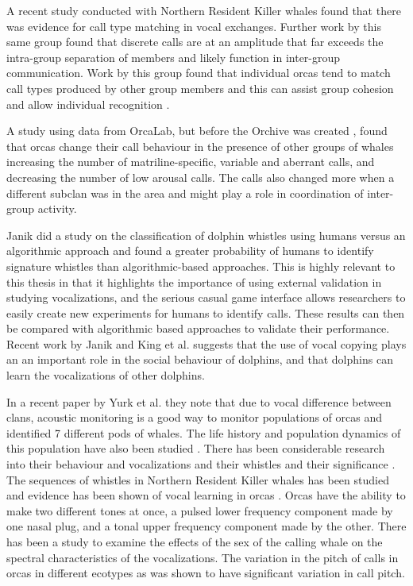 A recent study \cite{miller2004matching} conducted with Northern
Resident Killer whales found that there was evidence for call type
matching in vocal exchanges.  Further work by this same group
\cite{miller2006diversity} found that discrete calls are at an
amplitude that far exceeds the intra-group separation of members and
likely function in inter-group communication.  Work by this group
found that individual orcas tend to match call types produced by other
group members \cite{miller2004matching} and this can assist group
cohesion \cite{miller2002mixed} and allow individual recognition
\cite{miller2007caller}.

A study using data from OrcaLab, but before the Orchive was created
\cite{weiss2006vocal}, found that orcas change their call behaviour in
the presence of other groups of whales increasing the number of
matriline-specific, variable and aberrant calls, and decreasing the
number of low arousal calls.  The calls also changed more when a
different subclan was in the area and might play a role in
coordination of inter-group activity.

Janik \cite{janik1999pitfalls} did a study on the classification of
dolphin whistles using humans versus an algorithmic approach and found
a greater probability of humans to identify signature whistles than
algorithmic-based approaches.  This is highly relevant to this thesis
in that it highlights the importance of using external validation in
studying vocalizations, and the serious casual game interface allows
researchers to easily create new experiments for humans to identify
calls.  These results can then be compared with algorithmic based
approaches to validate their performance.  Recent work by Janik and
King et al. \cite{king2013copying} suggests that the use of vocal
copying plays an an important role in the social behaviour of dolphins,
and that dolphins can learn the vocalizations of other dolphins.

In a recent paper by Yurk et al. \cite{yurk2010sequential} they note
that due to vocal difference between clans, acoustic monitoring is a
good way to monitor populations of orcas \cite{barretlennardphd} and
identified 7 different pods of whales.  The life history and
population dynamics of this population have also been studied
\cite{olesiuk1990life}.  There has been considerable research into
their behaviour and vocalizations \cite{thomsen1999orca} and their
whistles \cite{thomsen2001whistles} and their significance
\cite{thomsen2002significance}.  The sequences of whistles in Northern
Resident Killer whales has been studied \cite{riesch2008sequences} and
evidence has been shown of vocal learning in orcas
\cite{deecke2000dialect}.  Orcas have the ability to make two
different tones at once, a pulsed lower frequency component made by
one nasal plug, and a tonal upper frequency component made by the
other.  There has been a study to examine the effects of the sex of
the calling whale on the spectral characteristics \cite{miller07sex}
of the vocalizations.  The variation in the pitch of calls in orcas in
different ecotypes as was shown to have \cite{foote2008variation}
significant variation in call pitch.

